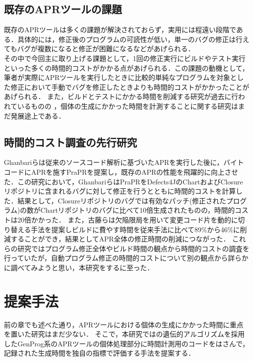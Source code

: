 \documentclass[uplatex,dvipdfmx,a4paper]{jsarticle}
\let\oldcite\cite
\renewcommand{\cite}[1]{\xspace\oldcite{#1}}
\begin{document}
\subsection{既存のAPRツールの課題} \label{sec:prev_challenge}
既存のAPRツールは多くの課題が解決されておらず\cite{le2013current}，実用には程遠い段階である．具体的には，修正後のプログラムの可読性が低い\cite{smith2015cure}，単一のバグの修正は行えてもバグが複数になると修正が困難になる\cite{saha2019harnessing}などがあげられる．\\
その中で今回主に取り上げる課題として，1回の修正実行にビルドやテスト実行といった多くの時間的コストがかかる点\cite{chen2017contract}があげられる．この課題の動機として，筆者が実際にAPRツールを実行したときに比較的単純なプログラムを対象とした修正において手動でバグを修正したときよりも時間的コストがかかったことがあげられる．
また，ビルドとテストにかかる時間を削減する研究が過去に行われているものの\cite{id692}
，個体の生成にかかった時間を計測することに関する研究はまだ発展途上である．
\subsection{時間的コスト調査の先行研究}
Ghanbari\cite{ghanbari2019practical}らは従来のソースコード解析に基づいたAPRを実行した後に，バイトコードにAPRを施すPraPRを提案し，既存のAPRの性能を飛躍的に向上させた．この研究において，GhanbariらはPraPRをDefects4JのChartおよびClosureリポジトリに含まれるバグに対して修正を行うとともに時間的コストを計算した．結果として，Closureリポジトリのバグでは有効なパッチ(修正されたプログラム)の数がChartリポジトリのバグに比べて10倍生成されたものの，時間的コストは20倍かかった．
また，古藤\cite{id692}らは欠陥限局を用いて変更コード片を動的に切り替える手法を提案しビルドに費やす時間を従来手法に比べて89\%から46\%に削減することができ，結果としてAPR全体の修正時間の削減につながった．
これらの研究ではプログラム修正全体やビルド時間の観点から時間的コストの調査を行っていたが，自動プログラム修正の時間的コストについて別の観点から詳らかに調べてみようと思い，本研究をするに至った．
\clearpage
\section{提案手法} \label{sec:sgst}
前の章でも述べた通り，APRツールにおける個体の生成にかかった時間に重点を置いた研究はまだ少ない．
そこで，本研究ではの遺伝的アルゴリズムを採用したGenProg\cite{le2011genprog}系のAPRツールの個体処理部分に時間計測用のコードをはさんで，記録された生成時間を独自の指標で評価する手法を提案する．
\clearpage
\end{document}
